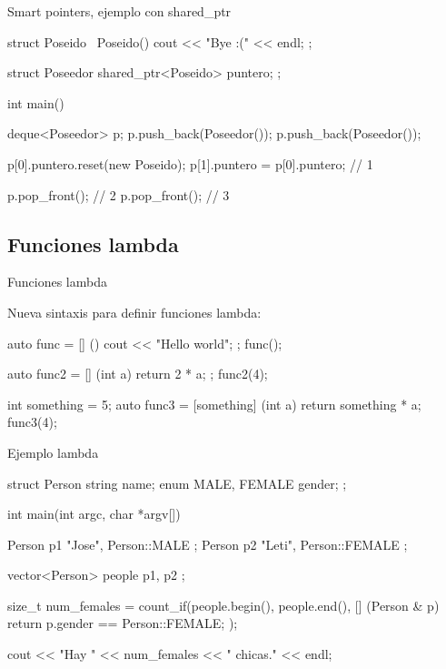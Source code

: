 \documentclass[8pt,xcolor=svgnames]{beamer}
\begin{document}
\begin{frame}[fragile]{Smart pointers, ejemplo con shared\_ptr}

  \begin{cppcode}
struct Poseido { 
    ~Poseido() { cout << "Bye :(" << endl; }
};

struct Poseedor {
    shared_ptr<Poseido> puntero;
};

int main() 
{
    deque<Poseedor> p;
    p.push_back(Poseedor());
    p.push_back(Poseedor());

    p[0].puntero.reset(new Poseido);
    p[1].puntero = p[0].puntero;      // 1

    p.pop_front();    // 2
    p.pop_front();    // 3
}    
  \end{cppcode}
  
\end{frame}

\subsection{Funciones lambda}

\begin{frame}[fragile]{Funciones lambda}
\centering

Nueva sintaxis para definir funciones lambda:

\begin{cppcode}
auto func = [] () { cout << "Hello world"; };
func();

auto func2 = [] (int a) { return 2 * a; };
func2(4);

int something = 5;
auto func3 = [something] (int a) { return something * a; }
func3(4);

\end{cppcode}

\end{frame}

\begin{frame}[fragile]{Ejemplo lambda}

\begin{cppcode}
struct Person {
    string name;
    enum { MALE, FEMALE } gender;
};

int main(int argc, char *argv[])
{
    Person p1 { "Jose", Person::MALE };
    Person p2 { "Leti", Person::FEMALE };

    vector<Person> people { p1, p2 };

    size_t num_females = count_if(people.begin(), people.end(), 
         [] (Person & p) { return p.gender == Person::FEMALE; });

    cout << "Hay " << num_females << " chicas." << endl;
}  
\end{cppcode}
  
\end{frame}
\end{document}
